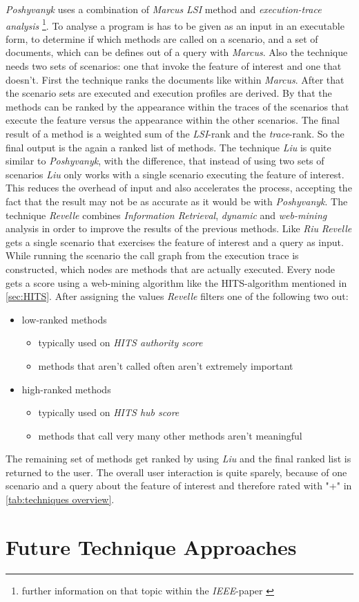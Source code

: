 \textit{Poshyvanyk} uses a combination of \textit{Marcus} \textit{LSI} method and \textit{execution-trace analysis} \footnote{further information on that topic within the \textit{IEEE}-paper \cite{antoniol2006feature}}. To analyse a program is has to be given as an input in an executable form, to determine if which methods are called on a scenario, and a set of documents, which can be defines out of a query with \textit{Marcus}. Also the technique needs two sets of scenarios: one that invoke the feature of interest and one that doesn't. First the technique ranks the documents like within \textit{Marcus}. After that the scenario sets are executed and execution profiles are derived. By that the methods can be ranked by the appearance within the traces of the scenarios that execute the feature versus the appearance within the other scenarios. The final result of a method is a weighted sum of the \textit{LSI}-rank and the \textit{trace}-rank. So the final output is the again a ranked list of methods. \cite{poshyvanyk2007feature} \newline
The technique \textit{Liu} is quite similar to \textit{Poshyvanyk}, with the difference, that instead of using two sets of scenarios \textit{Liu} only works with a single scenario executing the feature of interest. This reduces the overhead of input and also accelerates the process, accepting the fact that the result may not be as accurate as it would be with \textit{Poshyvanyk}. \cite{liu2007feature} \newline
The technique \textit{Revelle} combines \textit{Information Retrieval}, \textit{dynamic} and \textit{web-mining} analysis in order to improve the results of the previous methods. Like \textit{Riu} \textit{Revelle} gets a single scenario that exercises the feature of interest and a query as input. While running the scenario the call graph from the execution trace is constructed, which nodes are methods that are actually executed. Every node gets a score using a web-mining algorithm like the HITS-algorithm mentioned in \autoref{sec:HITS}. After assigning the values \textit{Revelle} filters one of the following two out:
\begin{itemize}
	\item low-ranked methods 
	\begin{itemize}
		\item typically used on \textit{HITS authority score}
		\item methods that aren't called often aren't extremely important
	\end{itemize}
	\item high-ranked methods 
	\begin{itemize}
		\item typically used on \textit{HITS hub score}
		\item  methods that call very many other methods aren't meaningful
	\end{itemize}
\end{itemize} 
The remaining set of methods get ranked by using \textit{Liu} and the final ranked list is returned to the user.
The overall user interaction is quite sparely, because of one scenario and a query about the feature of interest and therefore rated with "+" in \autoref{tab:techniques overview}. \cite{revelle2010using}

\section{Future Technique Approaches}



